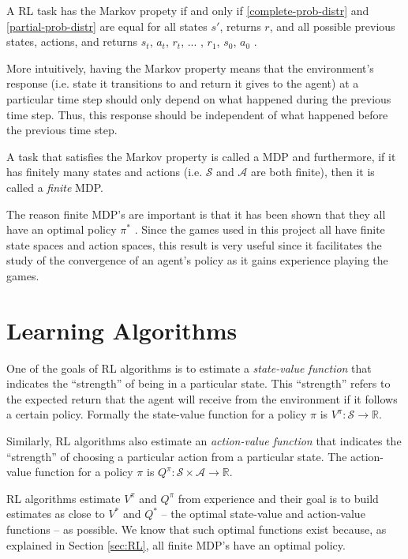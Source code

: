 \documentclass[11pt,a4paper]{report}
\begin{document}
A RL task has the Markov propety if and only if \ref{complete-prob-distr} and \ref{partial-prob-distr} are equal for all states $s'$, returns $r$, and all possible previous states, actions, and returns $s_t$, $a_t$, $r_t$, ... , $r_1$, $s_0$, $a_0$ \cite{rl-book}.

More intuitively, having the Markov property means that the environment's response (i.e. state it transitions to and return it gives to the agent) at a particular time step should only depend on what happened during the previous time step. Thus, this response should be independent of what happened before the previous time step.

A task that satisfies the Markov property is called a MDP and furthermore, if it has finitely many states and actions (i.e. $\mathcal{S}$ and $\mathcal{A}$ are both finite), then it is called a \emph{finite} MDP. 

The reason finite MDP's are important is that it has been shown that they all have an optimal policy $\pi^{\ast}$ \cite{rl-book}. Since the games used in this project all have finite state spaces and action spaces, this result is very useful since it facilitates the study of the convergence of an agent's policy as it gains experience playing the games.


\section{Learning Algorithms}
\label{sec:learning-algorithms}

One of the goals of RL algorithms is to estimate a \emph{state-value function} that indicates the ``strength'' of being in a particular state. This ``strength'' refers to the expected return that the agent will receive from the environment if it follows a certain policy. Formally the state-value function for a policy $\pi$ is $V^{\pi} : \mathcal{S} \rightarrow \mathbb{R}$.

Similarly, RL algorithms also estimate an \emph{action-value function} that indicates the ``strength'' of choosing a particular action from a particular state. The action-value function for a policy $\pi$ is $Q^{\pi} : \mathcal{S} \times \mathcal{A} \rightarrow \mathbb{R}$.

RL algorithms estimate $V^{\pi}$ and $Q^{\pi}$ from experience and their goal is to build estimates as close to $V^{\ast}$ and $Q^{\ast}$ -- the optimal state-value and action-value functions -- as possible. We know that such optimal functions exist because, as explained in Section \ref{sec:RL}, all finite MDP's have an optimal policy.
\end{document}
